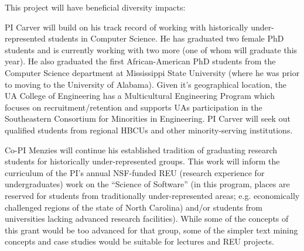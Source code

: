 This project will have beneficial diversity impacts:
\bi
\item
PI Carver will build on his track record of working with historically under-represented students in Computer Science.
He has graduated two female PhD students and is currently working with two more (one of whom will graduate this year).
He also graduated the first African-American PhD students from the Computer Science department at Mississippi State University (where he was prior to moving to the University of Alabama).
Given it's geographical location, the UA College of Engineering has a Multicultural Engineering Program which focuses on recruitment/retention and supports UAs participation in the Southeastern Consortium for Minorities in Engineering.
PI Carver will seek out qualified students from regional HBCUs and other minority-serving institutions.
\item
Co-PI Menzies will continue his established tradition of graduating research students for historically under-represented groups.   
This work will inform the curriculum of the PI's annual NSF-funded REU (research experience for undergraduates) work on the ``Science of Software'' (in this program, places are reserved for students from traditionally under-represented areas;  e.g.  economically challenged regions of the state of North Carolina) and/or students from universities lacking advanced research facilities). 
While some of the concepts of this grant would be too advanced for that group, some of the simpler text mining concepts and case studies would be suitable for lectures and REU projects.
\ei
\vspace{8pt}



